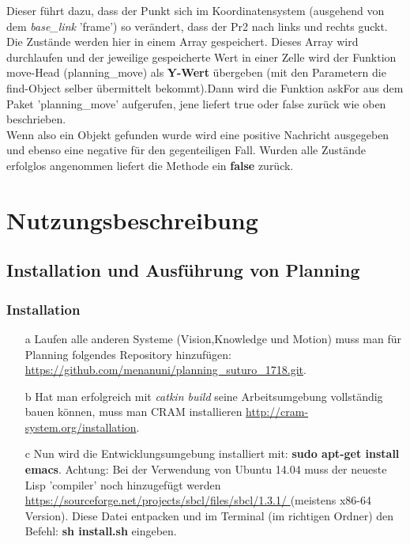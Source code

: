 \documentclass{suturo}
\begin{document}
 Dieser führt dazu, dass der Punkt sich im Koordinatensystem (ausgehend von dem \textit{base\_link} 'frame') so verändert, dass der Pr2 nach links und rechts guckt. Die Zustände werden hier in einem Array gespeichert. Dieses Array wird durchlaufen und der jeweilige gespeicherte Wert in einer Zelle wird der Funktion move-Head (planning\_move) als \textbf{Y-Wert} übergeben (mit den Parametern die find-Object selber übermittelt bekommt).Dann wird die Funktion askFor aus dem Paket 'planning\_move' aufgerufen, jene liefert true oder false zurück wie oben beschrieben.\\
 
 Wenn also ein Objekt gefunden wurde wird eine positive Nachricht ausgegeben und ebenso eine negative für den gegenteiligen Fall.
  Wurden alle Zustände erfolglos angenommen liefert die Methode ein \textbf{false} zurück.
  
\newpage
\section{Nutzungsbeschreibung}

\subsection{Installation und Ausführung von Planning}

\subsubsection{Installation}
\begin{itemize}


\item[a] Laufen alle anderen Systeme (Vision,Knowledge und Motion) muss man für Planning folgendes Repository hinzufügen: \url{https://github.com/menanuni/planning_suturo_1718.git}. 

\item[b] Hat man erfolgreich mit \textit{catkin build} seine Arbeitsumgebung vollständig bauen können, muss man CRAM installieren \url{http://cram-system.org/installation}.

\item[c] Nun wird die Entwicklungsumgebung installiert mit: \textbf{sudo apt-get install emacs}. Achtung: Bei der Verwendung von Ubuntu 14.04 muss der neueste Lisp 'compiler' noch hinzugefügt werden \url{https://sourceforge.net/projects/sbcl/files/sbcl/1.3.1/
} (meistens x86-64 Version). Diese Datei entpacken und im Terminal (im richtigen Ordner) den Befehl: \textbf{sh install.sh} eingeben.
\end{itemize}
\end{document}
